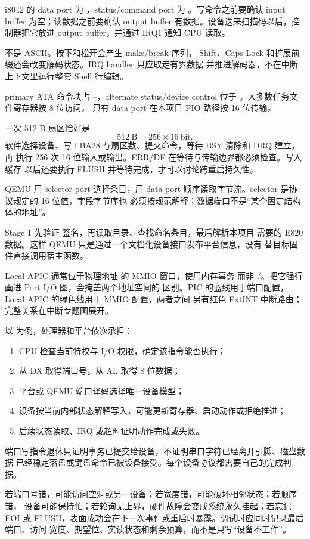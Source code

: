 i8042 的 data port 为 ，status/command port 为
。写命令之前要确认 input buffer 为空；读数据之前要确认 output
buffer 有数据。设备送来扫描码以后，控制器把它放进 output buffer，并通过
IRQ1 通知 CPU 读取。

不是 ASCII。按下和松开会产生 make/break 序列，
Shift、Caps Lock 和扩展前缀还会改变解码状态。IRQ handler 只应取走有界数据
并推进解码器，不在中断上下文里运行整套 Shell 行编辑。

primary ATA 命令块占 --，alternate
status/device control 位于 。大多数任务文件寄存器按 8 位访问，
只有 data port  在本项目 PIO 路径按 16 位传输。

一次 512 B 扇区恰好是
\[
512\ \mathrm{B}=256\times16\ \mathrm{bit}.
\]
软件选择设备、写 LBA28 与扇区数、提交命令，等待 BSY 清除和 DRQ 建立，再
执行 256 次 16 位输入或输出。ERR/DF 在等待与传输边界都必须检查。写入缓存
以后还要执行 FLUSH 并等待完成，才可以讨论跨重启持久性。

QEMU  用 selector port  选择条目，用 data port
 顺序读取字节流。selector 是协议规定的 16 位值，字段字节序也
必须按规范解释；数据端口不是“某个固定结构体的地址”。

Stage 1 先验证  签名，再读取目录、查找命名条目，最后解析本项目
需要的 E820 数据。这样 QEMU 只是通过一个文档化设备接口发布平台信息，没有
替目标固件直接调用宿主函数。

Local APIC 通常位于物理地址  的 MMIO 窗口，使用内存事务
而非 /。把它强行画进 Port I/O 图，会掩盖两个地址空间的
区别。PIC 的蓝线用于端口配置，Local APIC 的绿色线用于 MMIO 配置，两者之间
另有红色 ExtINT 中断路由；完整关系在中断专题图展开。

以  为例，处理器和平台依次承担：

\begin{enumerate}[leftmargin=2.2em]
  \item CPU 检查当前特权与 I/O 权限，确定该指令能否执行；
  \item 从 DX 取得端口号，从 AL 取得 8 位数据；
  \item 平台或 QEMU 端口译码选择唯一设备模型；
  \item 设备按当前内部状态解释写入，可能更新寄存器、启动动作或拒绝推进；
  \item 后续状态读取、IRQ 或超时证明动作完成或失败。
\end{enumerate}

端口写指令退休只证明事务已提交给设备，不证明串口字符已经离开引脚、磁盘数据
已经稳定落盘或键盘命令已被设备接受。每个设备协议都需要自己的完成判据。

\begin{failurebox}
若端口号错，可能访问空洞或另一设备；若宽度错，可能破坏相邻状态；若顺序错，
设备可能保持忙；若轮询无上界，硬件故障会变成系统永久挂起；若忘记 EOI 或
FLUSH，表面成功会在下一次事件或重启时暴露。调试时应同时记录最后端口、访问
宽度、期望位、实读状态和剩余预算，而不是只写“设备不工作”。
\end{failurebox}
